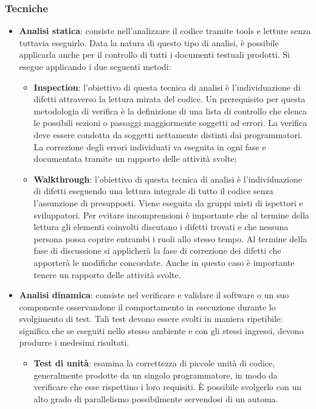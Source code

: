 \subsubsection {Tecniche}
\begin{itemize}
\item \textbf{Analisi statica}: consiste nell’analizzare il codice tramite tools e letture senza tuttavia eseguirlo. Data la natura di questo tipo di analisi, è possibile applicarla anche per il controllo di tutti i documenti testuali prodotti.
Si esegue applicando i due seguenti metodi:
\begin{itemize}
\item \textbf{Inspection}: l’obiettivo di questa tecnica di analisi è l’individuazione di difetti attraverso la lettura mirata del codice. Un prerequisito per questa metodologia di verifica è la definizione di una lista di controllo che elenca le possibili sezioni o passaggi maggiormente soggetti ad errori. La verifica deve essere condotta da soggetti nettamente distinti dai programmatori. La correzione degli errori individuati va eseguita in ogni fase e documentata tramite un rapporto delle attività svolte;

\item \textbf{Walkthrough}: l'obiettivo di questa tecnica di analisi è l'individuazione di difetti eseguendo una lettura integrale di tutto il codice senza l'assunzione di presupposti. Viene eseguita da gruppi misti di ispettori e sviluppatori.
Per evitare incomprensioni è importante che al termine della lettura gli elementi coinvolti discutano i difetti trovati e che nessuna persona possa coprire entrambi i ruoli allo stesso tempo.
Al termine della fase di discussione si applicherà la fase di correzione dei difetti che apporterà le modifiche concordate. 
Anche in questo caso è importante tenere un rapporto delle attività svolte.
\end{itemize}

\item \textbf{Analisi dinamica}: consiste nel verificare e validare il software o un suo componente osservandone il comportamento in esecuzione durante lo svolgimento di test. Tali test devono essere svolti in maniera ripetibile: significa che se eseguiti nello stesso ambiente e con gli stessi ingressi, devono produrre i medesimi risultati.
\begin{itemize}
\item \textbf{Test di unità}: esamina la correttezza di piccole unità di codice, generalmente prodotte da un singolo programmatore, in modo da verificare che esse rispettino i loro requisiti. È possibile svolgerlo con un alto grado di parallelismo possibilmente servendosi di un automa.


\end{itemize}
\end{itemize}
